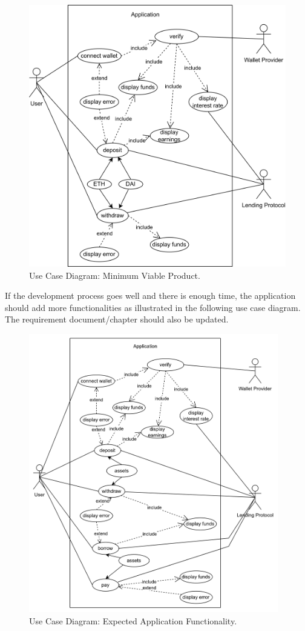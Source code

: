 \documentclass[11pt,a4paper]{report}
\begin{document}
\begin{figure}[htp]
	\centering
	\includegraphics[width=1\textwidth]{./images/USECASE-mvp}
	\caption{Use Case Diagram: Minimum Viable Product.}
	\label{fig:usecase-mvp}
\end{figure}
\newpage
If the development process goes well and there is enough time, the application should add more functionalities as illustrated in the following use case diagram. The requirement document/chapter\cite{ch:appreq} should also be updated.
\begin{figure}[htp]
	\centering
	\includegraphics[width=0.97\textwidth]{./images/USECASE-full_nofl}
	\caption{Use Case Diagram: Expected Application Functionality.}
	\label{fig:usecase-mvp}
\end{figure}
\end{document}
